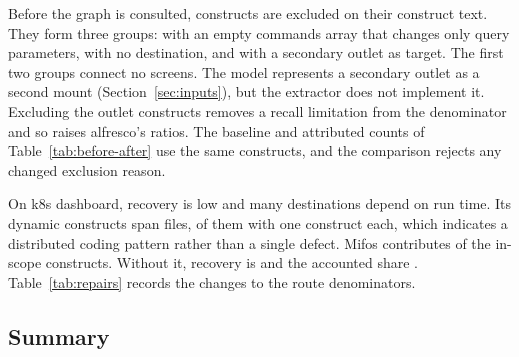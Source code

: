 Before the graph is consulted, \RoundTwoExcluded{} constructs are excluded on their construct text.
They form three groups: \RoundTwoExcludedQueryOnly{} with an empty commands array that changes only
query parameters, \RoundTwoExcludedNoCommands{} with no destination, and \RoundTwoExcludedOutlet{}
with a secondary outlet as target. The first two groups connect no screens. The model represents a
secondary outlet as a second mount (Section~\ref{sec:inputs}), but the extractor does not implement
it. Excluding the outlet constructs removes a recall limitation from the denominator and so
raises alfresco's ratios. The baseline and attributed counts of
Table~\ref{tab:before-after} use the same \RoundTwoInScope{} constructs, and the comparison rejects any
changed exclusion reason.

\begin{table}[t]\small
\caption{Construct accounting after the repairs of Appendix~\ref{app:corrections}.}
\label{tab:round2acct}
\TabRoundTwoAccounting
\par{}
\end{table}

On k8s dashboard, recovery is low and many destinations depend on run time. Its dynamic constructs
span \RoundTwoDynamicFiles{} files, \RoundTwoDynamicFilesOne{} of them with one construct each, which
indicates a distributed coding pattern rather than a single defect. Mifos contributes
\RoundTwoMifosShare{} of the in-scope constructs. Without it, recovery is \RoundTwoNoMifosRecovered{}
and the accounted share \RoundTwoNoMifosAccounted{}.
Table~\ref{tab:repairs} records the changes to the route denominators.

\subsection{Summary}
\label{sec:res-summary}

